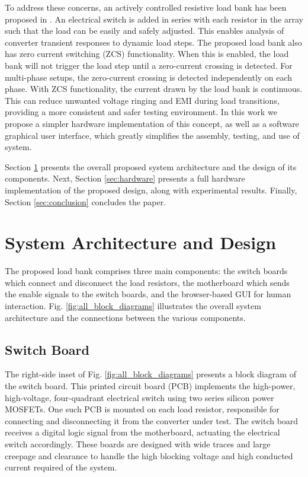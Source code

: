 \documentclass{article}
\begin{document}
To address these concerns, an actively controlled resistive load bank has been proposed in \cite{Jackson2021_PECI}. An electrical switch is added in series with each resistor in the array such that the load can be easily and safely adjusted. This enables analysis of converter transient responses to dynamic load steps. The proposed load bank also has zero current switching (ZCS) functionality. When this is enabled, the load bank will not trigger the load step until a zero-current crossing is detected. For multi-phase setups, the zero-current crossing is detected independently on each phase. With ZCS functionality, the current drawn by the load bank is continuous. This can reduce unwanted voltage ringing and EMI during load transitions, providing a more consistent and safer testing environment. In this work we propose a simpler hardware implementation of this concept, as well as a software graphical user interface, which greatly simplifies the assembly, testing, and use of system.

Section \ref{sec:system} presents the overall proposed system architecture and the design of its components. Next, Section \ref{sec:hardware} presents a full hardware implementation of the proposed design, along with experimental results. Finally, Section \ref{sec:conclusion} concludes the paper.

\vspace{0.5cm}
\section{System Architecture and Design}
\label{sec:system}

The proposed load bank comprises three main components: the switch boards which connect and disconnect the load resistors, the motherboard which sends the enable signals to the switch boards, and the browser-based GUI for human interaction. Fig. \ref{fig:all_block_diagrams} illustrates the overall system architecture and the connections between the various components.

\vspace{0.2cm}
\subsection{Switch Board}
\label{subsec:switch_board}

The right-side inset of Fig. \ref{fig:all_block_diagrams} presents a block diagram of the switch board. This printed circuit board (PCB) implements the high-power, high-voltage, four-quadrant electrical switch using two series silicon power MOSFETs. One such PCB is mounted on each load resistor, responsible for connecting and disconnecting it from the converter under test. The switch board receives a digital logic signal from the motherboard, actuating the electrical switch accordingly. These boards are designed with wide traces and large creepage and clearance to handle the high blocking voltage and high conducted current required of the system.
\end{document}
